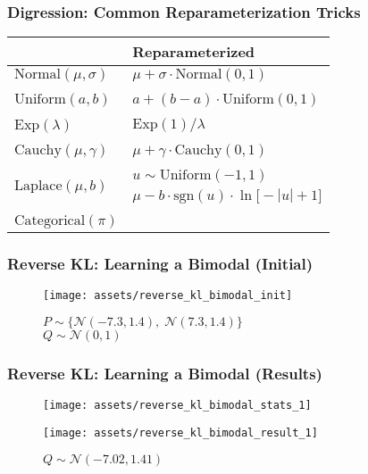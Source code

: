 \documentclass{beamer}
\newcommand{\xmark}{\textcolor{red}{\ding{55}}}
\begin{document}
\begin{frame}
  \frametitle{Digression: Common Reparameterization Tricks}
  \begin{center}
  \begin{tabular}{C{5cm}C{5cm}}
  \toprule
  {} & Reparameterized \\
  \midrule
  $\text{Normal}(\mu, \sigma)$   &  $\mu + \sigma \cdot \text{Normal}(0, 1)$ \\
  \\
  $\text{Uniform}(a, b)$   &  $a + (b - a) \cdot \text{Uniform}(0, 1)$ \\
  \\
  $\text{Exp}(\lambda)$   &  $\text{Exp}(1) / \lambda$ \\
  \\
  $\text{Cauchy}(\mu, \gamma)$   &  $\mu + \gamma \cdot \text{Cauchy}(0, 1)$ \\
  \\
    &  $u \sim \text{Uniform}(-1, 1)$ \\
                                          & $\mu - b \cdot \text{sgn}(u) \cdot \ln \big[-|u|+1 \big]$ \\
                                          \\
  $\text{Categorical}(\pi)$ & \xmark \\
  \bottomrule
  \end{tabular}
  \end{center}
\end{frame}

\begin{frame}
  \frametitle{Reverse KL: Learning a Bimodal (Initial)}
  \begin{figure}
    \centering
    \texttt{[image: assets/reverse\_kl\_bimodal\_init]}
    \caption{$P \sim \big\{\mathcal{N}(-7.3, 1.4), \; \mathcal{N}(7.3, 1.4) \big\}$\\$Q \sim \mathcal{N}(0, 1)$}
  \end{figure}
\end{frame}

\begin{frame}
  \frametitle{Reverse KL: Learning a Bimodal (Results)}
  \begin{figure}
    \centering
    \texttt{[image: assets/reverse\_kl\_bimodal\_stats\_1]}
  \end{figure}
  \begin{figure}
    \centering
    \texttt{[image: assets/reverse\_kl\_bimodal\_result\_1]}
    \caption{$Q \sim \mathcal{N}(-7.02, 1.41)$}
  \end{figure}
\end{frame}
\end{document}
